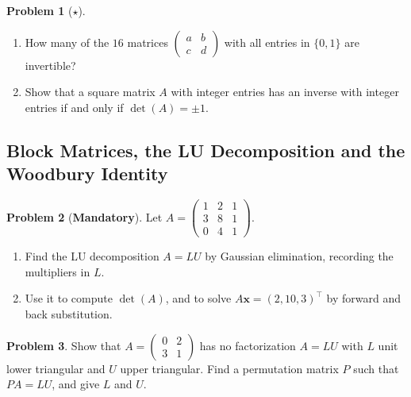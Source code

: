 \documentclass[11pt]{article}
\theoremstyle{definition}
\newtheorem{problem}{Problem}[section]
\newcommand{\mandatory}{\textcolor{red!70!black}{\textbf{Mandatory}}}
\begin{document}
\begin{problem}[$\star$]\label{pr:01-matrices}
    \begin{enumerate}[label=(\alph*)]
        \item How many of the $16$ matrices $\begin{pmatrix} a & b \\ c & d \end{pmatrix}$ with all entries in $\{0, 1\}$ are invertible?
        \item Show that a square matrix $A$ with integer entries has an inverse with integer entries if and only if $\det(A) = \pm 1$.
    \end{enumerate}
\end{problem}

\subsection{Block Matrices, the LU Decomposition and the Woodbury Identity}

\begin{problem}[\mandatory]\label{pr:lu-compute}
    Let $A = \begin{pmatrix} 1 & 2 & 1 \\ 3 & 8 & 1 \\ 0 & 4 & 1 \end{pmatrix}$.
    \begin{enumerate}[label=(\alph*)]
        \item Find the LU decomposition $A = LU$ by Gaussian elimination, recording the multipliers in $L$.
        \item Use it to compute $\det(A)$, and to solve $A\mathbf{x} = (2, 10, 3)^\top$ by forward and back substitution.
    \end{enumerate}
\end{problem}

\begin{problem}\label{pr:lu-pivot}
    Show that $A = \begin{pmatrix} 0 & 2 \\ 3 & 1 \end{pmatrix}$ has no factorization $A = LU$ with $L$ unit lower triangular and $U$ upper triangular. Find a permutation matrix $P$ such that $PA = LU$, and give $L$ and $U$.
\end{problem}
\end{document}
